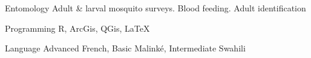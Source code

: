 

\begin{cvskills}

  \cvskill
    {Entomology} %
    {Adult \& larval mosquito surveys.  Blood feeding. Adult identification} %

  \cvskill
    {Programming} %
    {R, ArcGis, QGis, LaTeX} %
    
  \cvskill
    {Language} %
    {Advanced French, Basic Malink\'e, Intermediate Swahili} %

\end{cvskills}
